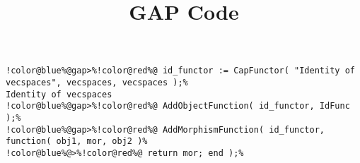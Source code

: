 \documentclass[12pt]{amsart}
\title{GAP Code}
\author{}
\begin{document}
\maketitle

\begin{Verbatim}[commandchars=!@\%,frame=single]
!color@blue%@gap>%!color@red%@ id_functor := CapFunctor( "Identity of vecspaces", vecspaces, vecspaces );%
Identity of vecspaces
!color@blue%@gap>%!color@red%@ AddObjectFunction( id_functor, IdFunc );%
!color@blue%@gap>%!color@red%@ AddMorphismFunction( id_functor, function( obj1, mor, obj2 )%
!color@blue%@>%!color@red%@ return mor; end );%
\end{Verbatim}
\end{document}
